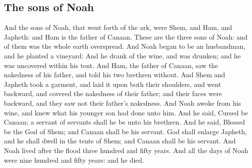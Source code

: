 \begin{biblechapter}
\section*{The sons of Noah}
\verse And the sons of Noah, that went forth of the ark, were Shem, and Ham, and Japheth: and Ham is the father of Canaan.
\verse These are the three sons of Noah: and of them was the whole earth overspread.
\verse And Noah began to be an husbandman, and he planted a vineyard:
\verse And he drank of the wine, and was drunken; and he was uncovered within his tent.
\verse And Ham, the father of Canaan, saw the nakedness of his father, and told his two brethren without.
\verse And Shem and Japheth took a garment, and laid it upon both their shoulders, and went backward, and covered the nakedness of their father; and their faces were backward, and they saw not their father's nakedness.
\verse And Noah awoke from his wine, and knew what his younger son had done unto him.
\verse And he said, Cursed be Canaan; a servant of servants shall he be unto his brethren.
\verse And he said, Blessed be the \LORD God of Shem; and Canaan shall be his servant.
\verse God shall enlarge Japheth, and he shall dwell in the tents of Shem; and Canaan shall be his servant.
\verse And Noah lived after the flood three hundred and fifty years.
\verse And all the days of Noah were nine hundred and fifty years: and he died.
\end{biblechapter}

